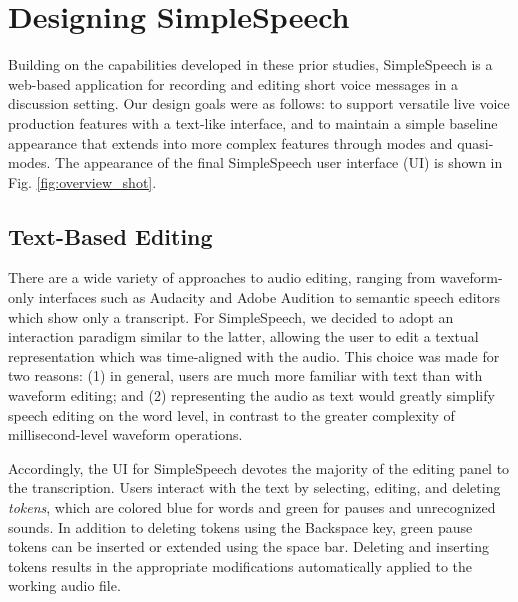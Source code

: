 \section{Designing SimpleSpeech}
Building on the capabilities developed in these prior studies, SimpleSpeech is a web-based application for recording and editing short voice messages in a discussion setting.
Our design goals were as follows: to support versatile live voice production features with a text-like interface, and to maintain a simple baseline appearance that extends into more complex features through modes and quasi-modes.
The appearance of the final SimpleSpeech user interface (UI) is shown in Fig. \ref{fig:overview_shot}.

\subsection{Text-Based Editing}
There are a wide variety of approaches to audio editing, ranging from waveform-only interfaces such as Audacity and Adobe Audition to semantic speech editors \cite{whittaker_semantic} which show only a transcript. 
For SimpleSpeech, we decided to adopt an interaction paradigm similar to the latter, allowing the user to edit a textual representation which was time-aligned with the audio.
This choice was made for two reasons: (1) in general, users are much more familiar with text than with waveform editing; and (2) representing the audio as text would greatly simplify speech editing on the word level, in contrast to the greater complexity of millisecond-level waveform operations. 

Accordingly, the UI for SimpleSpeech devotes the majority of the editing panel to the transcription. 
Users interact with the text by selecting, editing, and deleting \textit{tokens}, which are colored blue for words and green for pauses and unrecognized sounds. 
In addition to deleting tokens using the Backspace key, green pause tokens can be inserted or extended using the space bar.
Deleting and inserting tokens results in the appropriate modifications automatically applied to the working audio file.

